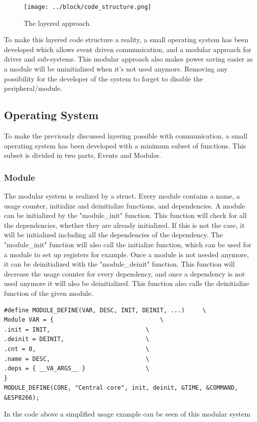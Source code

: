 \begin{figure}[H]
	\centering
	\label{fig:code_structure}
	\texttt{[image: ../block/code\_structure.png]}
	\caption{The layered approach.}
\end{figure}
To make this layered code structure a reality, a small operating system has been developed which allows event driven communication, and a modular approach for driver and sub-systems. This modular approach also makes power saving easier as a module will be uninitialized when it's not used anymore. Removing any possibility for the developer of the system to forget to disable the peripheral/module.\newpar

\subsection{Operating System}
To make the previously discussed layering possible with communication, a small operating system has been developed with a minimum subset of functions. This subset is divided in two parts, Events and Modules.
\subsubsection{Module}
The modular system is realized by a struct. Every module contains a name, a usage counter, initialize and deinitialize functions, and dependencies. A module can be initialized by the "module\_init" function. This function will check for all the dependencies, whether they are already initialized. If this is not the case, it will be initialized including all the dependencies of the dependency. The "module\_init" function will also call the initialize function, which can be used for a module to set up registers for example. Once a module is not needed anymore, it can be deinitialized with the "module\_deinit" function. This function will decrease the usage counter for every dependency, and once a dependency is not used anymore it will also be deinitialized. This function also calls the deinitialize function of the given module.

\begin{verbatim}
#define MODULE_DEFINE(VAR, DESC, INIT, DEINIT, ...)     \
Module VAR = {                          	\
.init = INIT,                           \
.deinit = DEINIT,                       \
.cnt = 0,                               \
.name = DESC,                           \
.deps = { __VA_ARGS__ }                 \
} 
MODULE_DEFINE(CORE, "Central core", init, deinit, &TIME, &COMMAND, &ESP8266);
\end{verbatim}
In the code above a simplified usage example can be seen of this modular system

